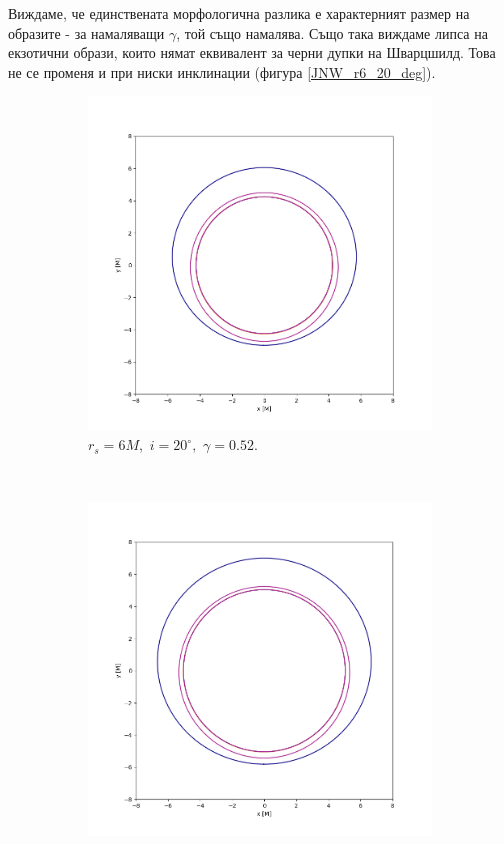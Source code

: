 Виждаме, че единствената морфологична разлика е характерният размер на образите - за намаляващи $\gamma$, той също намалява. Също така виждаме липса на екзотични образи, които нямат еквивалент за черни дупки на Шварцшилд. Това не се променя и при ниски инклинации (фигура \ref{JNW_r6_20_deg}).


\begin{figure}[!htb]
	\begin{subfigure}{6cm}
		\includegraphics[scale = 0.3]{JNW_20_deg_r6_gamma_0.52.png}
		\caption{$r_s = 6M,\,\, i = 20^\circ,\,\,\gamma = 0.52$.} 
	\end{subfigure}\,\,\,
	\begin{subfigure}{6cm}
		\includegraphics[scale = 0.3]{JNW_20_deg_r6_gamma_0.8.png}

\end{subfigure}
\end{figure}
